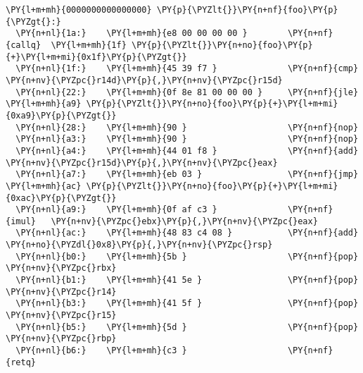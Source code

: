 \begin{Verbatim}[commandchars=\\\{\}]
\PY{l+m+mh}{0000000000000000} \PY{p}{\PYZlt{}}\PY{n+nf}{foo}\PY{p}{\PYZgt{}:}
  \PY{n+nl}{1a:}	\PY{l+m+mh}{e8 00 00 00 00 }      	\PY{n+nf}{callq}  \PY{l+m+mh}{1f} \PY{p}{\PYZlt{}}\PY{n+no}{foo}\PY{p}{+}\PY{l+m+mi}{0x1f}\PY{p}{\PYZgt{}}
  \PY{n+nl}{1f:}	\PY{l+m+mh}{45 39 f7 }            	\PY{n+nf}{cmp}    \PY{n+nv}{\PYZpc{}r14d}\PY{p}{,}\PY{n+nv}{\PYZpc{}r15d}
  \PY{n+nl}{22:}	\PY{l+m+mh}{0f 8e 81 00 00 00 }   	\PY{n+nf}{jle}    \PY{l+m+mh}{a9} \PY{p}{\PYZlt{}}\PY{n+no}{foo}\PY{p}{+}\PY{l+m+mi}{0xa9}\PY{p}{\PYZgt{}}
  \PY{n+nl}{28:}	\PY{l+m+mh}{90 }                  	\PY{n+nf}{nop}
  \PY{n+nl}{a3:}	\PY{l+m+mh}{90 }                  	\PY{n+nf}{nop}
  \PY{n+nl}{a4:}	\PY{l+m+mh}{44 01 f8 }            	\PY{n+nf}{add}    \PY{n+nv}{\PYZpc{}r15d}\PY{p}{,}\PY{n+nv}{\PYZpc{}eax}
  \PY{n+nl}{a7:}	\PY{l+m+mh}{eb 03 }               	\PY{n+nf}{jmp}    \PY{l+m+mh}{ac} \PY{p}{\PYZlt{}}\PY{n+no}{foo}\PY{p}{+}\PY{l+m+mi}{0xac}\PY{p}{\PYZgt{}}
  \PY{n+nl}{a9:}	\PY{l+m+mh}{0f af c3 }            	\PY{n+nf}{imul}   \PY{n+nv}{\PYZpc{}ebx}\PY{p}{,}\PY{n+nv}{\PYZpc{}eax}
  \PY{n+nl}{ac:}	\PY{l+m+mh}{48 83 c4 08 }         	\PY{n+nf}{add}    \PY{n+no}{\PYZdl{}0x8}\PY{p}{,}\PY{n+nv}{\PYZpc{}rsp}
  \PY{n+nl}{b0:}	\PY{l+m+mh}{5b }                  	\PY{n+nf}{pop}    \PY{n+nv}{\PYZpc{}rbx}
  \PY{n+nl}{b1:}	\PY{l+m+mh}{41 5e }               	\PY{n+nf}{pop}    \PY{n+nv}{\PYZpc{}r14}
  \PY{n+nl}{b3:}	\PY{l+m+mh}{41 5f }               	\PY{n+nf}{pop}    \PY{n+nv}{\PYZpc{}r15}
  \PY{n+nl}{b5:}	\PY{l+m+mh}{5d }                  	\PY{n+nf}{pop}    \PY{n+nv}{\PYZpc{}rbp}
  \PY{n+nl}{b6:}	\PY{l+m+mh}{c3 }                  	\PY{n+nf}{retq}   
\end{Verbatim}

